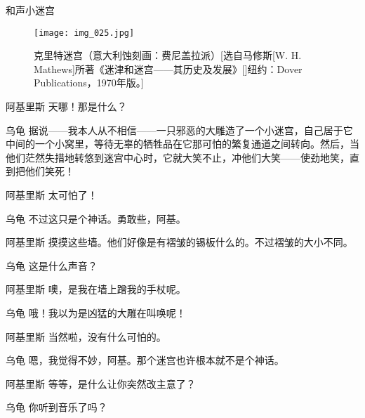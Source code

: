 \begin{dialog}{和声小迷宫}
\begin{dialogue}
\begin{dialogue}
\begin{dialogue}
\begin{dialogue}
\begin{figure}
\texttt{[image: img\_025.jpg]}
\caption[克里特迷宫。]
  {克里特迷宫（意大利蚀刻画：费尼盖拉派）[选自马修斯[W. H. Mathews]所著《迷津和迷宫——其历史及发展》[]纽约：Dover Publications，1970年版。] }
\end{figure}

      \item[阿基里斯]天哪！那是什么？

      \item[乌龟]据说——我本人从不相信——一只邪恶的大雕造了一个小迷宫，自己居于它中间的一个小窝里，等待无辜的牺牲品在它那可怕的繁复通道之间转向。然后，当他们茫然失措地转悠到迷宫中心时，它就大笑不止，冲他们大笑——使劲地笑，直到把他们笑死！

      \item[阿基里斯]太可怕了！

      \item[乌龟]不过这只是个神话。勇敢些，阿基。


      \item[阿基里斯]摸摸这些墙。他们好像是有褶皱的锡板什么的。不过褶皱的大小不同。


      \item[乌龟\dlnote{（吃惊地）}]这是什么声音？

      \item[阿基里斯]噢，是我在墙上蹭我的手杖呢。

      \item[乌龟]哦！我以为是凶猛的大雕在叫唤呢！

      \item[阿基里斯]当然啦，没有什么可怕的。


      \item[乌龟]嗯，我觉得不妙，阿基。那个迷宫也许根本就不是个神话。

      \item[阿基里斯]等等，是什么让你突然改主意了？

      \item[乌龟]你听到音乐了吗？



\end{dialogue}
\end{dialogue}
\end{dialogue}
\end{dialogue}
\end{dialog}

